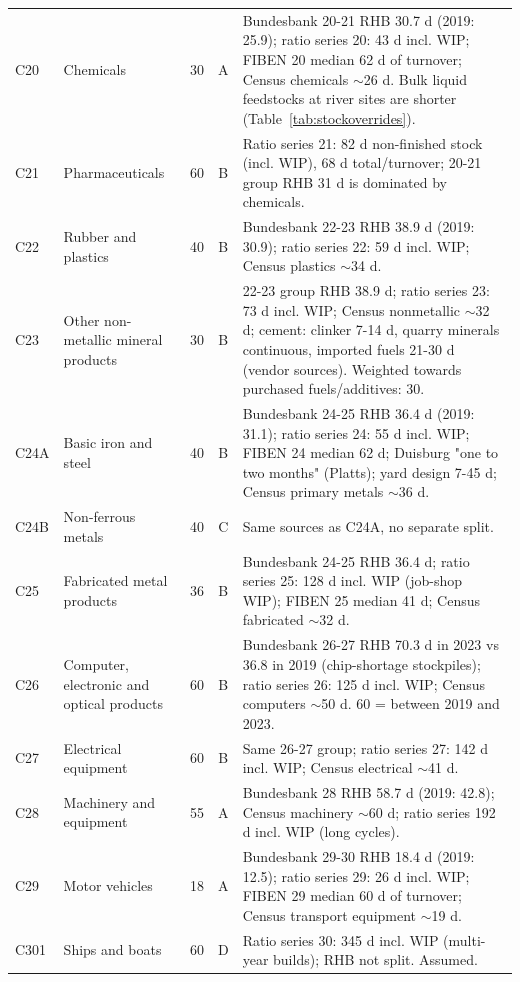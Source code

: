 \begin{longtable}{L{16mm}L{38mm}rcL{76mm}}
C20 & Chemicals & 30 & A & Bundesbank 20-21 RHB 30.7 d (2019: 25.9); ratio series 20: 43 d incl. WIP; FIBEN 20 median 62 d of turnover; Census chemicals $\sim$26 d. Bulk liquid feedstocks at river sites are shorter (Table~\ref{tab:stockoverrides}). \\
C21 & Pharmaceuticals & 60 & B & Ratio series 21: 82 d non-finished stock (incl. WIP), 68 d total/turnover; 20-21 group RHB 31 d is dominated by chemicals. \\
C22 & Rubber and plastics & 40 & B & Bundesbank 22-23 RHB 38.9 d (2019: 30.9); ratio series 22: 59 d incl. WIP; Census plastics $\sim$34 d. \\
C23 & Other non-metallic mineral products & 30 & B & 22-23 group RHB 38.9 d; ratio series 23: 73 d incl. WIP; Census nonmetallic $\sim$32 d; cement: clinker 7-14 d, quarry minerals continuous, imported fuels 21-30 d (vendor sources). Weighted towards purchased fuels/additives: 30. \\
C24A & Basic iron and steel & 40 & B & Bundesbank 24-25 RHB 36.4 d (2019: 31.1); ratio series 24: 55 d incl. WIP; FIBEN 24 median 62 d; Duisburg "one to two months" (Platts); yard design 7-45 d; Census primary metals $\sim$36 d. \\
C24B & Non-ferrous metals & 40 & C & Same sources as C24A, no separate split. \\
C25 & Fabricated metal products & 36 & B & Bundesbank 24-25 RHB 36.4 d; ratio series 25: 128 d incl. WIP (job-shop WIP); FIBEN 25 median 41 d; Census fabricated $\sim$32 d. \\
C26 & Computer, electronic and optical products & 60 & B & Bundesbank 26-27 RHB 70.3 d in 2023 vs 36.8 in 2019 (chip-shortage stockpiles); ratio series 26: 125 d incl. WIP; Census computers $\sim$50 d. 60 = between 2019 and 2023. \\
C27 & Electrical equipment & 60 & B & Same 26-27 group; ratio series 27: 142 d incl. WIP; Census electrical $\sim$41 d. \\
C28 & Machinery and equipment & 55 & A & Bundesbank 28 RHB 58.7 d (2019: 42.8); Census machinery $\sim$60 d; ratio series 192 d incl. WIP (long cycles). \\
C29 & Motor vehicles & 18 & A & Bundesbank 29-30 RHB 18.4 d (2019: 12.5); ratio series 29: 26 d incl. WIP; FIBEN 29 median 60 d of turnover; Census transport equipment $\sim$19 d. \\
C301 & Ships and boats & 60 & D & Ratio series 30: 345 d incl. WIP (multi-year builds); RHB not split. Assumed. \\

\end{longtable}
